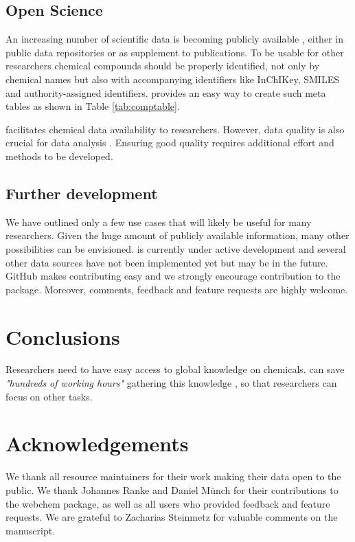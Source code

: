 \documentclass[article, shortnames]{jss}\usepackage[]{graphicx}\usepackage[]{color}
\begin{document}
\subsection[Open Science]{Open Science}
An increasing number of scientific data is becoming publicly available \citep{Gewin_2016, Reichman_Jones_Schildhauer_2011,Boyle_Guha_2011}, either in public data repositories or as supplement to publications.
To be usable for other researchers chemical compounds should be properly identified, not only by chemical names but also with accompanying identifiers like InChIKey, SMILES and authority-assigned identifiers.
 provides an easy way to create such meta tables as shown in Table \ref{tab:comptable}.

 facilitates chemical data availability to researchers.
However, data quality is also crucial for data analysis \citep{Stieger_2014}. 
Ensuring good quality requires additional effort and methods to be developed.


\subsection[Further development]{Further development}
We have outlined only a few use cases that will likely be useful for many researchers.
Given the huge amount of publicly available information, many other possibilities can be envisioned.
 is currently under active development and several other data sources have not been implemented yet but may be in the future.
GitHub makes contributing easy and we strongly encourage contribution to the package.
Moreover, comments, feedback and feature requests are highly welcome.


\section[Conclusions]{Conclusions}
Researchers need to have easy access to global knowledge on chemicals.
 can save \emph{"hundreds of working hours"} gathering this knowledge \citep{Munch_Galizia_2016}, so that researchers can focus on other tasks.


\section*{Acknowledgements}
We thank all resource maintainers for their work making their data open to the public.
We thank Johannes Ranke and Daniel Münch for their contributions to the webchem package, as well as all users who provided feedback and feature requests. 
We are grateful to Zacharias Steinmetz for valuable comments on the manuscript.



\end{document}
